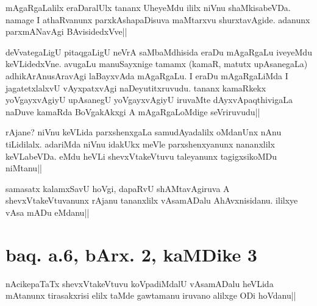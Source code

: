 
\begin{artha}
mAgaRgaLalilx eraDaralUlx tananx UheyeMdu ililx niVnu shaMkisabeVDa. 
namage I athaRvanunx parxkAshapaDisuva maMtarxvu shurxtavAgide. 
adanunx parxmANavAgi BAvisidedxVve||
\end{artha}


\stext


\begin{artha}
deVvategaLigU pitaqgaLigU neVrA saMbaMdhisida eraDu mAgaRgaLu iveyeMdu 
keVLidedxVne. avugaLu manuSayxnige tamamx (kamaR, matutx upAsanegaLa) 
adhikArAnusAravAgi laBayxvAda mAgaRgaLu. I eraDu mAgaRgaLiMda I 
jagatetxlalxvU vAyxpatxvAgi naDeyutitxruvudu. tananx kamaRkekx 
yoVgayxvAgiyU upAsanegU yoVgayxvAgiyU iruvaMte dAyxvApaqthivigaLa 
naDuve kamaRda BoVgakAkxgi A mAgaRgaLoMdige seVriruvudu||
\end{artha}

\begin{artha}
rAjane? niVnu keVLida parxshenxgaLa samudAyadalilx oMdanUnx nAnu 
tiLidilalx. adariMda niVnu idakUkx meVle parxshenxyanunx nananxlilx 
keVLabeVDa. eMdu heVLi shevxVtakeVtuvu taleyanunx tagigxsikoMDu 
niMtanu||
\end{artha}


\begin{artha}
samasatx kalamxSavU hoVgi, dapaRvU shAMtavAgiruva A 
shevxVtakeVtuvanunx rAjanu tananxlilx vAsamADalu AhAvxnisidanu. 
ililxye vAsa mADu eMdanu||
\end{artha}

\section*{baq. a.6, bArx. 2, kaMDike 3}

\stext


\begin{artha}
nAcikepaTaTx shevxVtakeVtuvu koVpadiMdalU vAsamADalu heVLida mAtanunx 
tirasakxrisi elilx taMde gawtamanu iruvano alilxge ODi hoVdanu||
\end{artha}

